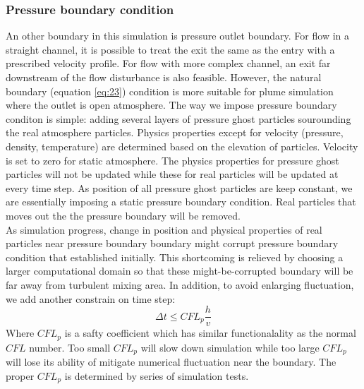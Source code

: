 \documentclass[10pt,a4paper]{article}
\begin{document}
\subsubsection{Pressure boundary condition}
An other boundary in this simulation is pressure outlet boundary. For flow in a straight channel, it is possible to treat the exit the same as the entry with a prescribed velocity profile. For flow with more complex channel, an exit far downstream of the flow disturbance is also feasible. However, the natural boundary (equation \ref{eq:23}) condition is more suitable for plume simulation where the outlet is open atmosphere. The way we impose pressure boundary conditon is simple: adding several layers of pressure ghost particles sourounding the real atmosphere particles. Physics properties except for velocity (pressure, density, temperature) are determined based on the elevation of particles. Velocity is set to zero for static atmosphere. The physics properties for pressure ghost particles will not be updated while these for real particles will be updated at every time step. As position of all pressure ghost particles are keep constant, we are essentially imposing a static pressure boundary condition. Real particles that moves out the the pressure boundary will be removed.\\
As simulation progress, change in position and physical properties of real particles near pressure boundary boundary might corrupt pressure boundary condition that established initially. This shortcoming is relieved by choosing a larger computational domain so that these might-be-corrupted boundary will be far away from turbulent mixing area. In addition, to avoid enlarging fluctuation, we add another constrain on time step: 
\begin{equation}
\Delta t \leq CFL_p \dfrac{h}{v}
\end{equation}
Where $CFL_p$ is a safty coefficient which has similar functionalality as the normal $CFL$ number. Too small $CFL_p$ will slow down simulation while too large $CFL_p$ will lose its ability of mitigate numerical fluctuation near the boundary. The proper $CFL_p$ is determined by series of simulation tests. 
\end{document}
